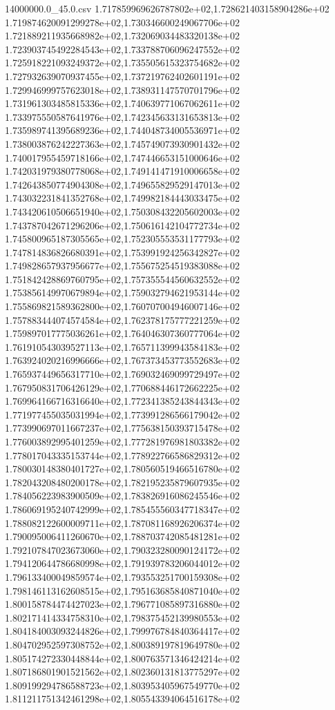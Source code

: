 \begin{filecontents*}{14000000.0_45.0.csv}
1.717859969626787802e+02,1.728621403158904286e+02
1.719874620091299278e+02,1.730346600249067706e+02
1.721889211935668982e+02,1.732069034483320138e+02
1.723903745492284543e+02,1.733788706096247552e+02
1.725918221093249372e+02,1.735505615323754682e+02
1.727932639070937455e+02,1.737219762402601191e+02
1.729946999757623018e+02,1.738931147570701796e+02
1.731961303485815336e+02,1.740639771067062611e+02
1.733975550587641976e+02,1.742345633131653813e+02
1.735989741395689236e+02,1.744048734005536971e+02
1.738003876242227363e+02,1.745749073930901432e+02
1.740017955459718166e+02,1.747446653151000646e+02
1.742031979380778068e+02,1.749141471910006658e+02
1.742643850774904308e+02,1.749655829529147013e+02
1.743032231841352768e+02,1.749982184443033475e+02
1.743420610506651940e+02,1.750308432205602003e+02
1.743787042671296206e+02,1.750616142104772734e+02
1.745800965187305565e+02,1.752305553531177793e+02
1.747814836826680391e+02,1.753991924256342827e+02
1.749828657937956677e+02,1.755675254519383088e+02
1.751842428869760795e+02,1.757355544560632552e+02
1.753856149970679894e+02,1.759032794621953144e+02
1.755869821589362800e+02,1.760707004946007146e+02
1.757883444074574584e+02,1.762378175777221259e+02
1.759897017775036261e+02,1.764046307360777064e+02
1.761910543039527113e+02,1.765711399943584183e+02
1.763924020216996666e+02,1.767373453773552683e+02
1.765937449656317710e+02,1.769032469099729497e+02
1.767950831706426129e+02,1.770688446172662225e+02
1.769964166716316640e+02,1.772341385243844343e+02
1.771977455035031994e+02,1.773991286566179042e+02
1.773990697011667237e+02,1.775638150393715478e+02
1.776003892995401259e+02,1.777281976981803382e+02
1.778017043335153744e+02,1.778922766586829312e+02
1.780030148380401727e+02,1.780560519466516780e+02
1.782043208480200178e+02,1.782195235879607935e+02
1.784056223983900509e+02,1.783826916086245546e+02
1.786069195240742999e+02,1.785455560347718347e+02
1.788082122600009711e+02,1.787081168926206374e+02
1.790095006411260670e+02,1.788703742085481281e+02
1.792107847023673060e+02,1.790323280090124172e+02
1.794120644786680998e+02,1.791939783206044012e+02
1.796133400049859574e+02,1.793553251700159308e+02
1.798146113162608515e+02,1.795163685840871040e+02
1.800158784474427023e+02,1.796771085897316880e+02
1.802171414334758310e+02,1.798375452139980553e+02
1.804184003093244826e+02,1.799976784840364417e+02
1.804702952597308752e+02,1.800389197819649780e+02
1.805174272330448844e+02,1.800763571346424214e+02
1.807186801901521562e+02,1.802360131813775297e+02
1.809199294786588723e+02,1.803953405967549770e+02
1.811211751342461298e+02,1.805543394064516178e+02

\end{filecontents*}

